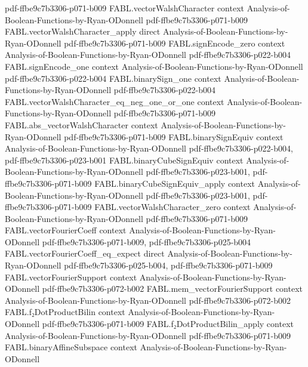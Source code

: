 \begin{theorem}
  {pdf-ffbe9c7b3306-p071-b009}
\proofstep
  {FABL.vectorWalshCharacter}
  {context}
  {Analysis-of-Boolean-Functions-by-Ryan-ODonnell}
  {pdf-ffbe9c7b3306-p071-b009}
\proofstep
  {FABL.vectorWalshCharacter_apply}
  {direct}
  {Analysis-of-Boolean-Functions-by-Ryan-ODonnell}
  {pdf-ffbe9c7b3306-p071-b009}
\proofstep
  {FABL.signEncode_zero}
  {context}
  {Analysis-of-Boolean-Functions-by-Ryan-ODonnell}
  {pdf-ffbe9c7b3306-p022-b004}
\proofstep
  {FABL.signEncode_one}
  {context}
  {Analysis-of-Boolean-Functions-by-Ryan-ODonnell}
  {pdf-ffbe9c7b3306-p022-b004}
\proofstep
  {FABL.binarySign_one}
  {context}
  {Analysis-of-Boolean-Functions-by-Ryan-ODonnell}
  {pdf-ffbe9c7b3306-p022-b004}
\proofstep
  {FABL.vectorWalshCharacter_eq_neg_one_or_one}
  {context}
  {Analysis-of-Boolean-Functions-by-Ryan-ODonnell}
  {pdf-ffbe9c7b3306-p071-b009}
\proofstep
  {FABL.abs_vectorWalshCharacter}
  {context}
  {Analysis-of-Boolean-Functions-by-Ryan-ODonnell}
  {pdf-ffbe9c7b3306-p071-b009}
\proofstep
  {FABL.binarySignEquiv}
  {context}
  {Analysis-of-Boolean-Functions-by-Ryan-ODonnell}
  {pdf-ffbe9c7b3306-p022-b004,
    pdf-ffbe9c7b3306-p023-b001}
\proofstep
  {FABL.binaryCubeSignEquiv}
  {context}
  {Analysis-of-Boolean-Functions-by-Ryan-ODonnell}
  {pdf-ffbe9c7b3306-p023-b001,
    pdf-ffbe9c7b3306-p071-b009}
\proofstep
  {FABL.binaryCubeSignEquiv_apply}
  {context}
  {Analysis-of-Boolean-Functions-by-Ryan-ODonnell}
  {pdf-ffbe9c7b3306-p023-b001,
    pdf-ffbe9c7b3306-p071-b009}
\proofstep
  {FABL.vectorWalshCharacter_zero}
  {context}
  {Analysis-of-Boolean-Functions-by-Ryan-ODonnell}
  {pdf-ffbe9c7b3306-p071-b009}
\proofstep
  {FABL.vectorFourierCoeff}
  {context}
  {Analysis-of-Boolean-Functions-by-Ryan-ODonnell}
  {pdf-ffbe9c7b3306-p071-b009,
    pdf-ffbe9c7b3306-p025-b004}
\proofstep
  {FABL.vectorFourierCoeff_eq_expect}
  {direct}
  {Analysis-of-Boolean-Functions-by-Ryan-ODonnell}
  {pdf-ffbe9c7b3306-p025-b004,
    pdf-ffbe9c7b3306-p071-b009}
\proofstep
  {FABL.vectorFourierSupport}
  {context}
  {Analysis-of-Boolean-Functions-by-Ryan-ODonnell}
  {pdf-ffbe9c7b3306-p072-b002}
\proofstep
  {FABL.mem_vectorFourierSupport}
  {context}
  {Analysis-of-Boolean-Functions-by-Ryan-ODonnell}
  {pdf-ffbe9c7b3306-p072-b002}
\proofstep
  {FABL.f₂DotProductBilin}
  {context}
  {Analysis-of-Boolean-Functions-by-Ryan-ODonnell}
  {pdf-ffbe9c7b3306-p071-b009}
\proofstep
  {FABL.f₂DotProductBilin_apply}
  {context}
  {Analysis-of-Boolean-Functions-by-Ryan-ODonnell}
  {pdf-ffbe9c7b3306-p071-b009}
\proofstep
  {FABL.binaryAffineSubspace}
  {context}
  {Analysis-of-Boolean-Functions-by-Ryan-ODonnell}

\end{theorem}
